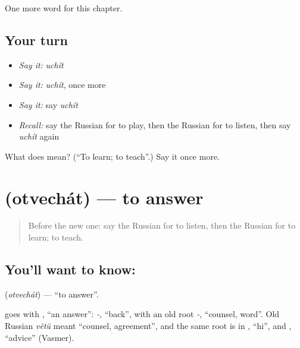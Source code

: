 \begin{grammarlens}[title={What you've built}]
One more word for this chapter.
\end{grammarlens}

\subsection*{Your turn}
\begin{itemize}
\raggedright
  \item \emph{Say it:} \emph{uchít}
  \item \emph{Say it:} \emph{uchít}, once more
  \item \emph{Say it:} say \emph{uchít}
  \item \emph{Recall:} say the Russian for to play, then the Russian for to listen, then say \emph{uchít} again
\end{itemize}

\begin{tcolorbox}[breakable,colback=teal!4,colframe=teal!35!black,title={Before you move on}]
What does  mean? (\textquotedblleft{}To learn; to teach\textquotedblright{}.) Say it once more.
\end{tcolorbox}
\section[\texorpdfstring{\ru{отвечать} (otvechát)}{отвечать (otvechát)}]{ (otvechát) — to answer}

\label{lesson:RU-C41-otvechat}



\begin{quote}
Before the new one: say the Russian for to listen, then the Russian for to learn; to teach.
\end{quote}

\subsection*{You'll want to know: }
\textbf{} (\emph{otvechát}) — \textquotedblleft{}to answer\textquotedblright{}.

\begin{cousinweb}
\textbf{} goes with \emph{}, \textquotedblleft{}an answer\textquotedblright{}: \emph{-}, \textquotedblleft{}back\textquotedblright{}, with an old root \emph{-}, \textquotedblleft{}counsel, word\textquotedblright{}. Old Russian \emph{větŭ} meant \textquotedblleft{}counsel, agreement\textquotedblright{}, and the same root is in \emph{}, \textquotedblleft{}hi\textquotedblright{}, and \emph{}, \textquotedblleft{}advice\textquotedblright{} (Vasmer).
\end{cousinweb}

